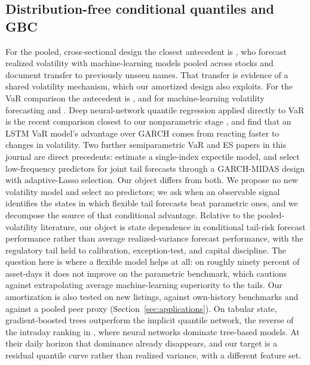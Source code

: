 \documentclass[11pt]{article}
\theoremstyle{remark}
\begin{document}
\subsection{Distribution-free conditional quantiles and GBC}

For the pooled, cross-sectional design the closest antecedent is
\citet{zhang2024commonality}, who forecast realized volatility with
machine-learning models pooled across stocks and document transfer to previously unseen names. That transfer is evidence of a shared volatility mechanism, which our amortized design also exploits. For the VaR comparison the antecedent is \citet{kuester2006}, and for machine-learning volatility forecasting \citet{bucci2020} and \citet{christensen2023ml}. Deep neural-network quantile regression applied directly to VaR is the recent comparison closest to our nonparametric stage \citep{chronopoulos2024}, and \citet{ormaniec2022lstm} find that an LSTM VaR model's advantage over GARCH comes from reacting faster to changes in volatility. Two further semiparametric VaR and ES papers in this journal are direct precedents: \citet{jiang2022singleindex} estimate a single-index expectile model, and \citet{luo2025midas} select low-frequency predictors for joint tail forecasts through a GARCH-MIDAS design with adaptive-Lasso selection. Our object differs from both. We propose no new volatility model and select no predictors; we ask when an observable signal identifies the states in which flexible tail forecasts beat parametric ones, and we decompose the source of that conditional advantage. Relative to the pooled-volatility literature, our object is state dependence in conditional tail-risk forecast performance rather than average realized-variance forecast performance, with the regulatory tail held to calibration, exception-test, and capital discipline. The question here
is where a flexible model helps at all: on roughly ninety percent of
asset-days it does not improve on the parametric benchmark, which cautions
against extrapolating average machine-learning superiority to the tails.
Our amortization is also tested on new listings, against own-history benchmarks and against a pooled peer proxy (Section~\ref{sec:applications}). On tabular state, gradient-boosted trees outperform the implicit quantile network, the reverse of the intraday ranking in \citet{zhang2024commonality}, where neural networks dominate tree-based models. At their daily horizon that dominance already disappears, and our target is a residual quantile curve rather than realized variance, with a different feature set.
\end{document}
